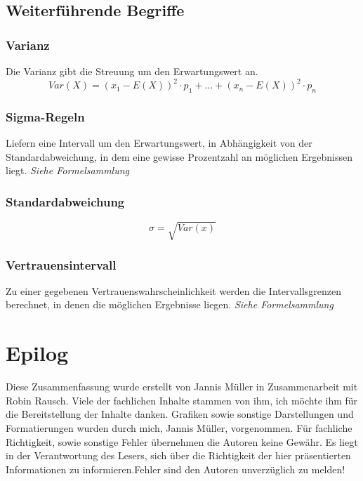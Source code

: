 \documentclass[a4paper, 15pt]{article}
\begin{document}
\subsection{Weiterführende Begriffe}
\begin{minipage}[t]{.45\textwidth}
\subsubsection{Varianz}
Die Varianz gibt die Streuung um den Erwartungswert an.
\begin{equation*}
Var(X)=(x_1-E(X))^2\cdot p_1 + \dots + (x_n-E(X))^2\cdot p_n
\end{equation*}
\subsubsection{Sigma-Regeln}
Liefern eine Intervall um den Erwartungswert, in Abhängigkeit von der Standardabweichung, in dem eine gewisse Prozentzahl an möglichen Ergebnissen liegt. \textit{Siehe Formelsammlung}
\end{minipage}
\hspace{1cm}
\begin{minipage}[t]{.45\textwidth}
\subsubsection{Standardabweichung}
\begin{equation*}
\sigma = \sqrt{Var(x)}
\end{equation*}
\vspace{.5cm}
\subsubsection{Vertrauensintervall}
Zu einer gegebenen Vertrauenswahrscheinlichkeit werden die Intervallsgrenzen berechnet, in denen die möglichen Ergebnisse liegen. \textit{Siehe Formelsammlung}
\end{minipage}
\section{Epilog}
Diese Zusammenfassung wurde erstellt von Jannis Müller in Zusammenarbeit mit Robin Rausch. Viele der fachlichen Inhalte stammen von ihm, ich möchte ihm für die Bereitstellung der Inhalte danken. Grafiken sowie sonstige Darstellungen und Formatierungen wurden durch mich, Jannis Müller, vorgenommen.\newline
Für fachliche Richtigkeit, sowie sonstige Fehler übernehmen die Autoren keine Gewähr. Es liegt in der Verantwortung des Lesers, sich über die Richtigkeit der hier präsentierten Informationen zu informieren.\newline Fehler sind den Autoren unverzüglich zu melden!
\end{document}
